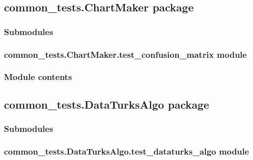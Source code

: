 \documentclass[letterpaper,10pt,english]{sphinxmanual}
\begin{document}
\subsection{common\_tests.ChartMaker package}
\label{\detokenize{common_tests.ChartMaker:common-tests-chartmaker-package}}\label{\detokenize{common_tests.ChartMaker::doc}}

\subsubsection{Submodules}
\label{\detokenize{common_tests.ChartMaker:submodules}}

\subsubsection{common\_tests.ChartMaker.test\_confusion\_matrix module}
\label{\detokenize{common_tests.ChartMaker:common-tests-chartmaker-test-confusion-matrix-module}}

\subsubsection{Module contents}
\label{\detokenize{common_tests.ChartMaker:module-common_tests.ChartMaker}}\label{\detokenize{common_tests.ChartMaker:module-contents}}

\subsection{common\_tests.DataTurksAlgo package}
\label{\detokenize{common_tests.DataTurksAlgo:common-tests-dataturksalgo-package}}\label{\detokenize{common_tests.DataTurksAlgo::doc}}

\subsubsection{Submodules}
\label{\detokenize{common_tests.DataTurksAlgo:submodules}}

\subsubsection{common\_tests.DataTurksAlgo.test\_dataturks\_algo module}
\label{\detokenize{common_tests.DataTurksAlgo:module-common_tests.DataTurksAlgo.test_dataturks_algo}}\label{\detokenize{common_tests.DataTurksAlgo:common-tests-dataturksalgo-test-dataturks-algo-module}}
\end{document}
